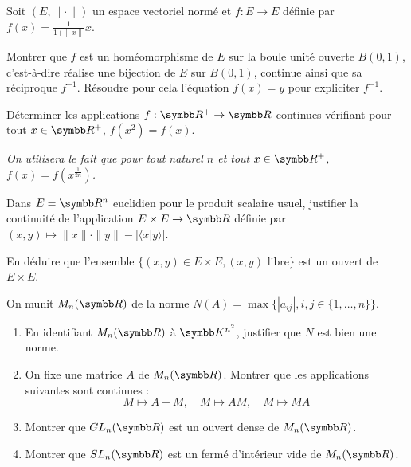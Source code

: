 \begin{exercice}
    Soit $(E, \| \cdot \|)$ un espace vectoriel normé et $f: E \rightarrow E$ définie par $f(x) = \frac{1}{1+\|x\|}x$.

    Montrer que $f$ est un homéomorphisme de $E$ sur la boule unité ouverte $B(0,1)$, 
    c'est-à-dire réalise une bijection de $E$ sur $B(0,1)$, continue ainsi que sa réciproque $f^{-1}$.
    Résoudre pour cela l'équation $f(x)=y$ pour expliciter $f^{-1}$.
\end{exercice}

\begin{exercice}
    Déterminer les applications $f: \R^{+} \rightarrow \R$ continues vérifiant pour tout $x \in \R^{+}$, $f(x^{2})=f(x)$.
    
    \textit{On utilisera le fait que pour tout naturel $n$ et tout $x \in \R^{+}$, $f(x) = f\left(x^{\frac{1}{2n}}\right)$.}
\end{exercice}

\begin{exercice}
    Dans $E=\R^{n}$ euclidien pour le produit scalaire usuel, justifier la continuité de l'application $E \times E \rightarrow \R$ 
    définie par $(x,y) \mapsto \|x\| \cdot \|y\| - |\langle x | y \rangle|$.

    En déduire que l'ensemble $\{(x,y) \in E \times E, (x,y) \text{ libre}\}$ est un ouvert de $E \times E$.
\end{exercice}

\begin{exercice}
    On munit $M_{n}(\R)$ de la norme $N(A) = \max \{|a_{ij}|, i,j \in \{1,\dots,n\}\}$.
    \begin{enumerate}
        \item En identifiant $M_{n}(\R)$ à $\K^{n^{2}}$, justifier que $N$ est bien une norme.
        \item On fixe une matrice $A$ de $M_{n}(\R)$. Montrer que les applications suivantes sont continues :
            \[M \mapsto A+M, \quad M \mapsto AM, \quad M \mapsto MA\]
        \item Montrer que $GL_{n}(\R)$ est un ouvert dense de $M_{n}(\R)$.
        \item Montrer que $SL_{n}(\R)$ est un fermé d'intérieur vide de $M_{n}(\R)$.
    \end{enumerate}
\end{exercice}

